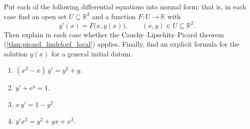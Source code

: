 \begin{exercise}
\label{ex:serra_normal_form_cauchy_lipschitz}
Put each of the following differential equations into normal form: that is, in each case find an
open set $U \subseteq \mathbb{R}^2$ and a function $F : U \to \mathbb{R}$ with
\[y'(x) = F\big(x,y(x)\big), \qquad (x,y) \in U \subseteq \mathbb{R}^2 .\]
Then explain in each case whether the Cauchy--Lipschitz--Picard theorem
(\cref{thm:picard_lindeloef_local}) applies. Finally, find an explicit formula for the solution
$y(x)$ for a general initial datum.
\begin{enumerate}[label=\textbf{(\alph*)}]
  \item $(x^2-x)\,y' = y^2 + y$.
  \item $y' + e^y = 1$.
  \item $x\,y' = 1 - y^2$.
  \item $y'x^2 = y^2 + yx + x^2$.
\end{enumerate}
\end{exercise}

